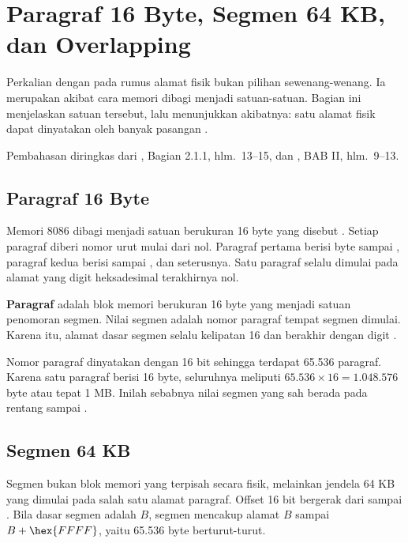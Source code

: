 \section{Paragraf 16 Byte, Segmen 64 KB, dan Overlapping}
\label{sec:paragraf-overlap}

Perkalian dengan  pada rumus alamat fisik bukan pilihan
sewenang-wenang. Ia merupakan akibat cara memori dibagi menjadi
satuan-satuan. Bagian ini menjelaskan satuan tersebut, lalu
menunjukkan akibatnya: satu alamat fisik dapat dinyatakan oleh
banyak pasangan .

Pembahasan diringkas dari \cite{gunawan2019}, Bagian 2.1.1,
hlm.~13--15, dan \cite{sto2001}, BAB II, hlm.~9--13.

\subsection{Paragraf 16 Byte}

Memori 8086 dibagi menjadi satuan berukuran 16 byte yang disebut
. Setiap paragraf diberi nomor urut mulai dari nol.
Paragraf pertama berisi byte  sampai ,
paragraf kedua berisi  sampai , dan
seterusnya. Satu paragraf selalu dimulai pada alamat yang digit
heksadesimal terakhirnya nol.

\begin{definisi}
\textbf{Paragraf} adalah blok memori berukuran 16 byte yang menjadi
satuan penomoran segmen. Nilai segmen adalah nomor paragraf tempat
segmen dimulai. Karena itu, alamat dasar segmen selalu kelipatan 16
dan berakhir dengan digit .
\end{definisi}

Nomor paragraf dinyatakan dengan 16 bit sehingga terdapat 65.536
paragraf. Karena satu paragraf berisi 16 byte, seluruhnya meliputi
$65.536 \times 16 = 1.048.576$ byte atau tepat 1 MB. Inilah sebabnya
nilai segmen yang sah berada pada rentang  sampai
.

\subsection{Segmen 64 KB}

Segmen bukan blok memori yang terpisah secara fisik, melainkan
jendela 64 KB yang dimulai pada salah satu alamat paragraf. Offset
16 bit bergerak dari  sampai . Bila dasar segmen
adalah $B$, segmen mencakup alamat $B$ sampai $B + \hex{FFFF}$,
yaitu 65.536 byte berturut-turut.

